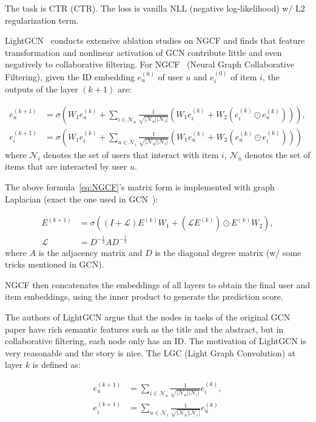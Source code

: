 The task is CTR (CTR).
The loss is vanilla NLL (negative log-likelihood) w/ L2 regularization term.

LightGCN~ conducts extensive ablation studies on NGCF and finds that feature transformation and nonlinear activation of GCN contribute little and even negatively to collaborative filtering.
For NGCF~ (Neural Graph Collaborative Filtering), given the ID embedding $e_u^{(0)}$ of user $u$ and $e_i^{(0)}$ of item $i$, the outputs of the layer $(k+1)$ are:

\begin{align}
	e_u^{(k+1)} &= \sigma\left( W_1 e_u^{(k)} + \sum_{i \in \mathcal{N}_u} \frac{1}{\sqrt{|\mathcal{N}_u||\mathcal{N}_i|}} (W_1 e_i^{(k)} + W_2(e_i^{(k)} \odot e_u^{(k)})) \right), \nonumber \\
	e_i^{(k+1)} &= \sigma\left( W_1 e_i^{(k)} + \sum_{u \in \mathcal{N}_i} \frac{1}{\sqrt{|\mathcal{N}_u||\mathcal{N}_i|}} (W_1 e_u^{(k)} + W_2(e_u^{(k)} \odot e_i^{(k)})) \right) \label{eq:NGCF}
\end{align}
where $\mathcal{N}_i$ denotes the set of users that interact with item $i$, $\mathcal{N}_u$ denotes the set of items that are interacted by user $u$.

The above formula~\ref{eq:NGCF}'s matrix form is implemented with graph Laplacian (exact the one used in GCN~):

\begin{align}
	E^{(k+1)} &= \sigma \left( (I + \mathcal{L}) E^{(k)} W_1 + (\mathcal{L} E^{(k)}) \odot E^{(k)} W_2 \right), \\
	\mathcal{L} &= D^{-\frac{1}{2}} A D^{-\frac{1}{2}}
\end{align}
where $A$ is the adjacency matrix and $D$ is the diagonal degree matrix (w/ some tricks mentioned in GCN).

NGCF then concatenates the embeddings of all layers to obtain the final user and item embeddings, using the inner product to generate the prediction score.

The authors of LightGCN argue that the nodes in tasks of the original GCN paper have rich semantic features such as the title and the abstract, but in collaborative filtering, each node only has an ID.
The motivation of LightGCN is very reasonable and the story is nice.
The LGC (Light Graph Convolution) at layer $k$ is defined as:

\begin{align}
	e_u^{(k+1)} &= \sum_{i \in \mathcal{N}_u} \frac{1}{\sqrt{|\mathcal{N}_u||\mathcal{N}_i|}} e_i^{(k)}, \\
	e_i^{(k+1)} &= \sum_{u \in \mathcal{N}_i} \frac{1}{\sqrt{|\mathcal{N}_u||\mathcal{N}_i|}} e_u^{(k)}
\end{align}

